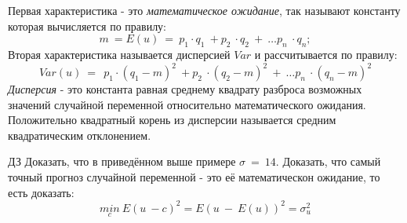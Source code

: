 \documentclass[12pt,a4paper]{article}
\begin{document}
Первая характеристика - это \textit{математическое ожидание}, так называют константу которая вычисляется по правилу:
\begin{equation*}
m\ =E( u) \ =\ p_{1} \cdot q_{1} \ +p_{2} \ \cdot q_{2} \ +\ \dotsc p_{n} \ \cdot q_{n} ;
\end{equation*}
Вторая характеристика называется дисперсией $\displaystyle Var$ и рассчитывается по правилу:
\begin{equation*}
Var( u) \ =\ \ p_{1} \cdot ( q_{1} -m)^{2} \ +p_{2} \ \cdot ( q_{2} -m)^{2} \ +\ \dotsc p_{n} \ \cdot ( q_{n} -m)^{2}
\end{equation*}
\textit{Дисперсия} - это константа равная среднему квадрату разброса возможных значений случайной переменной относительно математического ожидания. Положительно квадратный корень из дисперсии называется средним квадратическим отклонением.

$\displaystyle \boxed{\text{ДЗ}}$ Доказать, что в приведённом выше примере $\displaystyle \sigma \ =\ 14$. Доказать, что самый точный прогноз случайной переменной - это её математическон ожидание, то есть доказать:
\begin{equation*}
\underset{c}{min} \ E( u\ -c)^{2} =E( u\ -\ E( u))^{2} =\sigma ^{2}_{u}
\end{equation*}
\end{document}
